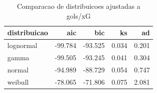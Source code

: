 \begin{table}

\caption{\label{tab:ajuste_dist_g20}Comparacao de distribuicoes ajustadas a gols/xG}
\centering
\begin{tabular}[t]{lrrrr}
\toprule
distribuicao & aic & bic & ks & ad\\
\midrule
lognormal & -99.784 & -93.525 & 0.034 & 0.201\\
gamma & -99.505 & -93.245 & 0.041 & 0.304\\
normal & -94.989 & -88.729 & 0.054 & 0.747\\
weibull & -78.065 & -71.806 & 0.075 & 2.081\\
\bottomrule
\end{tabular}
\end{table}
